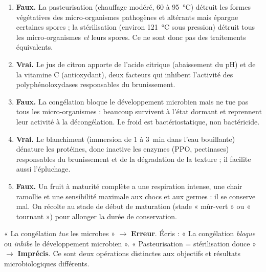\documentclass[11pt]{article}
\begin{document}
\begin{corrige}
\begin{enumerate}
\item \textbf{Faux.} La pasteurisation (chauffage modéré, $60$ à \SI{95}{\celsius}) détruit les formes végétatives des micro-organismes pathogènes et altérants mais épargne certaines spores ; la stérilisation (environ \SI{121}{\celsius} sous pression) détruit tous les micro-organismes \emph{et} leurs spores. Ce ne sont donc pas des traitements équivalents.
\item \textbf{Vrai.} Le jus de citron apporte de l'acide citrique (abaissement du pH) et de la vitamine C (antioxydant), deux facteurs qui inhibent l'activité des polyphénoloxydases responsables du brunissement.
\item \textbf{Faux.} La congélation bloque le développement microbien mais ne tue pas tous les micro-organismes : beaucoup survivent à l'état dormant et reprennent leur activité à la décongélation. Le froid est bactériostatique, non bactéricide.
\item \textbf{Vrai.} Le blanchiment (immersion de $1$ à \SI{3}{min} dans l'eau bouillante) dénature les protéines, donc inactive les enzymes (PPO, pectinases) responsables du brunissement et de la dégradation de la texture ; il facilite aussi l'épluchage.
\item \textbf{Faux.} Un fruit à maturité complète a une respiration intense, une chair ramollie et une sensibilité maximale aux chocs et aux germes : il se conserve mal. On récolte au stade de début de maturation (stade « mûr-vert » ou « tournant ») pour allonger la durée de conservation.
\end{enumerate}
\end{corrige}

\begin{attention}
« La congélation \emph{tue} les microbes » $\rightarrow$ \textbf{Erreur}. Écris : « La congélation \emph{bloque} ou \emph{inhibe} le développement microbien ». « Pasteurisation = stérilisation douce » $\rightarrow$ \textbf{Imprécis}. Ce sont deux opérations distinctes aux objectifs et résultats microbiologiques différents.
\end{attention}
\end{document}
